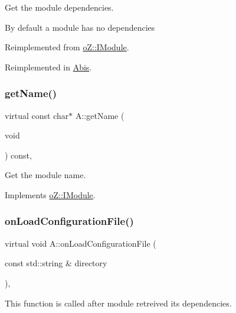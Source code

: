 Get the module dependencies. 

By default a module has no dependencies 

Reimplemented from \mbox{\hyperlink{classo_z_1_1_i_module_a720a329e6ebcbecbc150d8b0bbee6e37}{o\+Z\+::\+I\+Module}}.



Reimplemented in \mbox{\hyperlink{class_abis_a20476073293d54658c3891decbb4a725}{Abis}}.

\mbox{\label{class_a_a2d19f0df2a97d6c3ad2c763f9134af82}} 
\subsubsection{\texorpdfstring{getName()}{getName()}}
{\footnotesize\ttfamily virtual const char$\ast$ A\+::get\+Name (\begin{DoxyParamCaption}\item[{void}]{ }\end{DoxyParamCaption}) const\hspace{0.3cm}{\ttfamily [inline]}, {\ttfamily [virtual]}}



Get the module name. 



Implements \mbox{\hyperlink{classo_z_1_1_i_module_af41d45158fd28e1bd86a34e25f5282d6}{o\+Z\+::\+I\+Module}}.

\mbox{\label{class_a_aa096a581a39df500ec97e2d48c24fbef}} 
\subsubsection{\texorpdfstring{onLoadConfigurationFile()}{onLoadConfigurationFile()}}
{\footnotesize\ttfamily virtual void A\+::on\+Load\+Configuration\+File (\begin{DoxyParamCaption}\item[{const std\+::string \&}]{directory }\end{DoxyParamCaption})\hspace{0.3cm}{\ttfamily [inline]}, {\ttfamily [virtual]}}



This function is called after module retreived its dependencies. 

